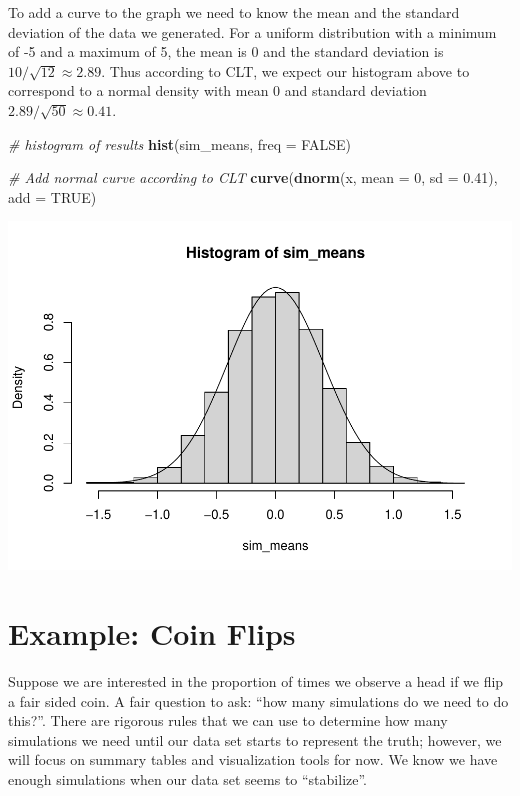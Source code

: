 \documentclass[
]{book}
\newenvironment{Shaded}{\begin{snugshade}}{\end{snugshade}}
\newcommand{\CommentTok}[1]{\textcolor[rgb]{0.56,0.35,0.01}{\textit{#1}}}
\newcommand{\DataTypeTok}[1]{\textcolor[rgb]{0.13,0.29,0.53}{#1}}
\newcommand{\DecValTok}[1]{\textcolor[rgb]{0.00,0.00,0.81}{#1}}
\newcommand{\FloatTok}[1]{\textcolor[rgb]{0.00,0.00,0.81}{#1}}
\newcommand{\KeywordTok}[1]{\textcolor[rgb]{0.13,0.29,0.53}{\textbf{#1}}}
\newcommand{\NormalTok}[1]{#1}
\newcommand{\OtherTok}[1]{\textcolor[rgb]{0.56,0.35,0.01}{#1}}
\begin{document}
To add a curve to the graph we need to know the mean and the standard deviation of the data we generated. For a uniform distribution with a minimum of -5 and a maximum of 5, the mean is 0 and the standard deviation is \(10/\sqrt{12} \approx 2.89\). Thus according to CLT, we expect our histogram above to correspond to a normal density with mean 0 and standard deviation \(2.89/\sqrt{50} \approx 0.41\).

\begin{Shaded}
\begin{Highlighting}[]
\CommentTok{# histogram of results}
\KeywordTok{hist}\NormalTok{(sim_means, }\DataTypeTok{freq =} \OtherTok{FALSE}\NormalTok{)}

\CommentTok{# Add normal curve according to CLT}
\KeywordTok{curve}\NormalTok{(}\KeywordTok{dnorm}\NormalTok{(x, }\DataTypeTok{mean =} \DecValTok{0}\NormalTok{, }\DataTypeTok{sd =} \FloatTok{0.41}\NormalTok{), }\DataTypeTok{add =} \OtherTok{TRUE}\NormalTok{)}
\end{Highlighting}
\end{Shaded}

\includegraphics{_main_files/figure-latex/unnamed-chunk-291-1.pdf}

\hypertarget{example-coin-flips}{%
\section{Example: Coin Flips}\label{example-coin-flips}}

Suppose we are interested in the proportion of times we observe a head if we flip a fair sided coin. A fair question to ask: ``how many simulations do we need to do this?''. There are rigorous rules that we can use to determine how many simulations we need until our data set starts to represent the truth; however, we will focus on summary tables and visualization tools for now. We know we have enough simulations when our data set seems to ``stabilize''.
\end{document}
